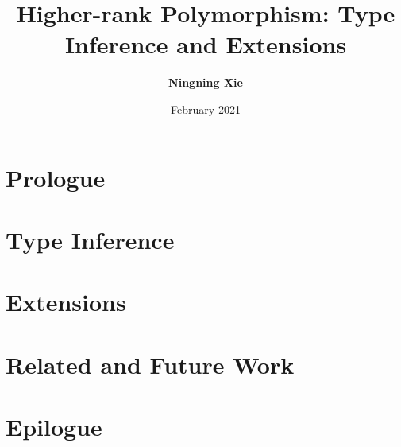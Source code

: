 

\title{Higher-rank Polymorphism: Type Inference and Extensions}
\author{\textbf{Ningning Xie}}
\date{February 2021}




\maketitle

\begin{abstract}
 
\end{abstract}


\frontmatter
\makedeclaration
\makeAck
\tableofcontents
\listoffigures
\listoftables

\mainmatter

\part{Prologue}





\part{Type Inference} \label{part:typeinference}





\part{Extensions} \label{part:extensions}






\part{Related and Future Work}





\part{Epilogue}


